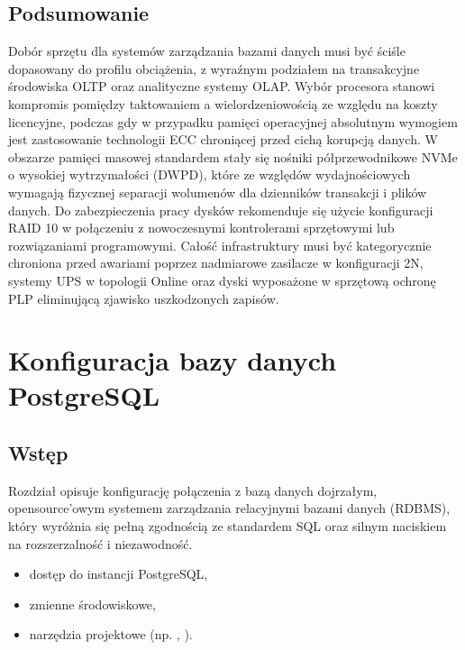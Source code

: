 \documentclass[letterpaper,10pt,polish]{sphinxmanual}
\begin{document}
\subsection{Podsumowanie}
\label{\detokenize{rozdzia_u0142_2/rozdzia_u0142_21/index:podsumowanie}}
\sphinxAtStartPar
Dobór sprzętu dla systemów zarządzania bazami danych musi być ściśle dopasowany do profilu obciążenia, z wyraźnym podziałem na transakcyjne środowiska OLTP oraz analityczne systemy OLAP. Wybór procesora stanowi kompromis pomiędzy taktowaniem a wielordzeniowością ze względu na koszty licencyjne, podczas gdy w przypadku pamięci operacyjnej absolutnym wymogiem jest zastosowanie technologii ECC chroniącej przed cichą korupcją danych. W obszarze pamięci masowej standardem stały się nośniki półprzewodnikowe NVMe o wysokiej wytrzymałości (DWPD), które ze względów wydajnościowych wymagają fizycznej separacji wolumenów dla dzienników transakcji i plików danych. Do zabezpieczenia pracy dysków rekomenduje się użycie konfiguracji RAID 10 w połączeniu z nowoczesnymi kontrolerami sprzętowymi lub rozwiązaniami programowymi. Całość infrastruktury musi być kategorycznie chroniona przed awariami poprzez nadmiarowe zasilacze w konfiguracji 2N, systemy UPS w topologii Online oraz dyski wyposażone w sprzętową ochronę PLP eliminującą zjawisko uszkodzonych zapisów.

\sphinxstepscope


\section{Konfiguracja bazy danych PostgreSQL}
\label{\detokenize{rozdzia_u0142_2/rozdzia_u0142_22/index:konfiguracja-bazy-danych-postgresql}}\label{\detokenize{rozdzia_u0142_2/rozdzia_u0142_22/index::doc}}

\subsection{Wstęp}
\label{\detokenize{rozdzia_u0142_2/rozdzia_u0142_22/index:wstep}}
\sphinxAtStartPar
Rozdział opisuje konfigurację połączenia z bazą danych  \textendash{} dojrzałym, open\sphinxhyphen{}source’owym systemem zarządzania relacyjnymi bazami danych (RDBMS), który wyróżnia się pełną zgodnością ze standardem SQL oraz silnym naciskiem na rozszerzalność i niezawodność.

\sphinxAtStartPar
{}
\begin{itemize}
\item {} 
\sphinxAtStartPar
dostęp do instancji PostgreSQL,

\item {} 
\sphinxAtStartPar
zmienne środowiskowe,

\item {} 
\sphinxAtStartPar
narzędzia projektowe (np. , ).

\end{itemize}
\end{document}
